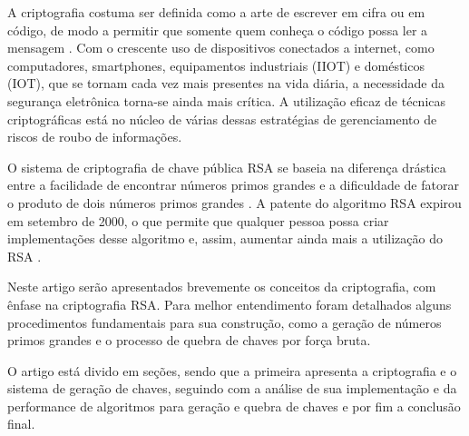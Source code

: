 A criptografia costuma ser definida como a arte de escrever em cifra ou em código, de modo a permitir que somente quem conheça o código possa ler a mensagem \cite{marcacini:10}. Com o crescente uso de dispositivos conectados a internet, como computadores, smartphones, equipamentos industriais (IIOT) e domésticos (IOT), que se tornam cada vez mais presentes na vida diária, a necessidade da segurança eletrônica torna-se ainda mais crítica. A utilização eficaz de técnicas criptográficas está no núcleo de várias dessas estratégias de gerenciamento de riscos de roubo de informações. \cite{burnett:02}


O sistema de criptografia de chave pública RSA se baseia na diferença drástica entre a facilidade de encontrar números primos grandes e a dificuldade de fatorar o produto de dois números primos grandes \cite{cormen:02}. A patente do algoritmo RSA expirou em setembro de 2000, o que permite que qualquer pessoa possa criar implementações desse algoritmo e, assim, aumentar ainda mais a utilização do RSA \cite{burnett:02}.


Neste artigo serão apresentados brevemente os conceitos da criptografia, com ênfase na criptografia RSA. Para melhor entendimento foram detalhados alguns procedimentos fundamentais para sua construção, como a geração de números primos grandes e o processo de quebra de chaves por força bruta.

O artigo está divido em seções, sendo que a primeira apresenta a criptografia e o sistema de geração de chaves, seguindo com a análise de sua implementação e da performance de algoritmos para geração e quebra de chaves e por fim a conclusão final.
